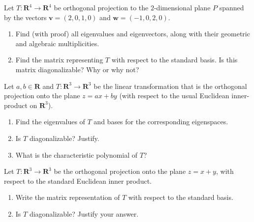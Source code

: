 \documentclass[11pt,twoside,openany]{memoir}
\begin{document}
        \begin{exercise}
        Let $T:\mathbf{R}^4\to \mathbf{R}^4$ be orthogonal projection to the $2$-dimensional plane $P$ spanned by the vectors $\mathbf{v}=(2,0,1,0)$ and $\mathbf{w}=(-1,0,2,0)$.
        \begin{enumerate}[label = (\arabic*)]
            \item Find (with proof) all eigenvalues and eigenvectors, along with their geometric and algebraic multiplicities.
            \item Find the matrix representing $T$ with respect to the standard basis. Is this matrix diagonalizable? Why or why not?
        \end{enumerate}
        \end{exercise}
        
        \begin{exercise}
        Let $a, b \in \mathbf{R}$ and $T: \mathbf{R}^3 \to \mathbf{R}^3$ be the linear transformation that is the orthogonal projection onto the plane $z=ax+by$ (with respect to the usual Euclidean inner-product on $\mathbf{R}^3$).
        \begin{enumerate}[label = (\arabic*)]
            \item Find the eigenvalues of $T$ and bases for the corresponding eigenspaces.
            \item Is $T$ diagonalizable? Justify.
            \item What is the characteristic polynomial of $T$?
        \end{enumerate}
        \end{exercise}
        
        \begin{exercise}
        Let $T:\mathbf{R}^3\to \mathbf{R}^3$ be the orthogonal projection onto the plane $z=x+y$, with respect to the standard Euclidean inner product.
        \begin{enumerate}[label = (\arabic*)]
            \item Write the matrix representation of $T$ with respect to the standard basis.
            \item Is $T$ diagonalizable? Justify your answer.
        \end{enumerate}
        \end{exercise}
        \newpage
        
\end{document}
